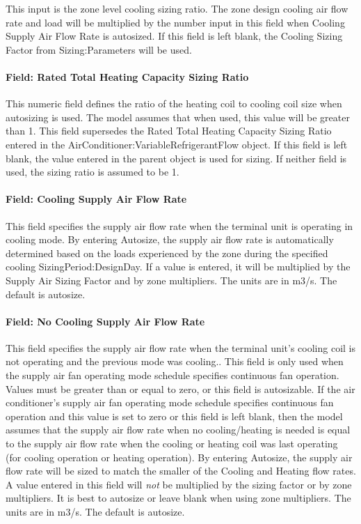 This input is the zone level cooling sizing ratio. The zone design cooling air flow rate and load will be multiplied by the number input in this field when Cooling Supply Air Flow Rate is autosized. If this field is left blank, the Cooling Sizing Factor from Sizing:Parameters will be used.

\paragraph{Field: Rated Total Heating Capacity Sizing Ratio}\label{field-rated-total-heating-capacity-sizing-ratio}

This numeric field defines the ratio of the heating coil to cooling coil size when autosizing is used. The model assumes that when used, this value will be greater than 1. This field supersedes the Rated Total Heating Capacity Sizing Ratio entered in the AirConditioner:VariableRefrigerantFlow object. If this field is left blank, the value entered in the parent object is used for sizing. If neither field is used, the sizing ratio is assumed to be 1.

\paragraph{Field: Cooling Supply Air Flow Rate}\label{field-cooling-supply-air-flow-rate-3}

This field specifies the supply air flow rate when the terminal unit is operating in cooling mode. By entering Autosize, the supply air flow rate is automatically determined based on the loads experienced by the zone during the specified cooling SizingPeriod:DesignDay. If a value is entered, it will be multiplied by the Supply Air Sizing Factor and by zone multipliers. The units are in m3/s. The default is autosize.

\paragraph{Field: No Cooling Supply Air Flow Rate}\label{field-no-cooling-supply-air-flow-rate}

This field specifies the supply air flow rate when the terminal unit's cooling coil is not operating and the previous mode was cooling.. This field is only used when the supply air fan operating mode schedule specifies continuous fan operation. Values must be greater than or equal to zero, or this field is autosizable. If the air conditioner's supply air fan operating mode schedule specifies continuous fan operation and this value is set to zero or this field is left blank, then the model assumes that the supply air flow rate when no cooling/heating is needed is equal to the supply air flow rate when the cooling or heating coil was last operating (for cooling operation or heating operation). By entering Autosize, the supply air flow rate will be sized to match the smaller of the Cooling and Heating flow rates. A value entered in this field will \emph{not} be multiplied by the sizing factor or by zone multipliers. It is best to autosize or leave blank when using zone multipliers. The units are in m3/s. The default is autosize.

